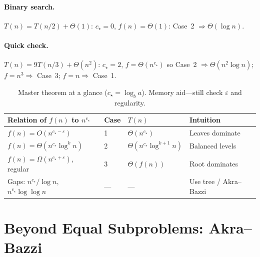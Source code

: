 \paragraph{Binary search.} $T(n)=T(n/2)+\Theta(1)$: $c_{\star}=0$, $f(n)=\Theta(1)$: Case~2 $\Rightarrow\Theta(\log n)$.
\paragraph{Quick check.} $T(n)=9T(n/3)+\Theta(n^{2})$: $c_{\star}=2$, $f=\Theta(n^{c_{\star}})$ so Case~2 $\Rightarrow\Theta(n^{2}\log n)$; $f=n^{3}\Rightarrow$ Case~3; $f=n\Rightarrow$ Case~1.

\begin{table}[htbp]
\centering\small
\begin{tabular}{@{}llll@{}}
\toprule
Relation of $f(n)$ to $n^{c_{\star}}$ & Case & $T(n)$ & Intuition \\
\midrule
$f(n)=O(n^{c_{\star}-\varepsilon})$ & 1 & $\Theta(n^{c_{\star}})$ & Leaves dominate \\
$f(n)=\Theta(n^{c_{\star}}\log^{k}n)$ & 2 & $\Theta(n^{c_{\star}}\log^{k+1}n)$ & Balanced levels \\
$f(n)=\Omega(n^{c_{\star}+\varepsilon})$, regular & 3 & $\Theta(f(n))$ & Root dominates \\
Gaps: $n^{c_{\star}}/\!\log n$, $n^{c_{\star}}\log\log n$ & --- & --- & Use tree / Akra--Bazzi \\
\bottomrule
\end{tabular}
\caption{Master theorem at a glance ($c_{\star}=\log_{b}a$). Memory aid---still check $\varepsilon$ and regularity.}
\label{tab:master}
\end{table}

\section{Beyond Equal Subproblems: Akra--Bazzi}

